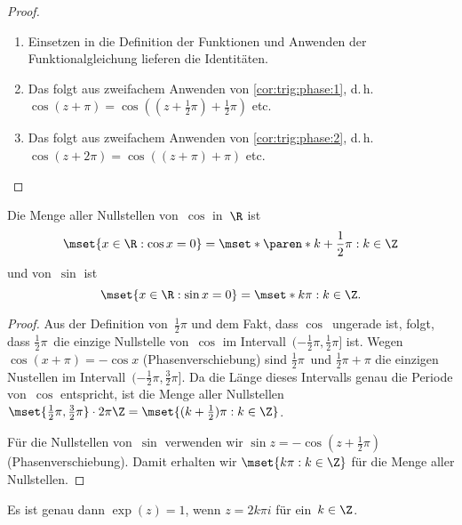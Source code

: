 \documentclass[a4paper]{article}
\begin{document}
\begin{proof}\leavevmode
    \begin{enumerate}
        \item Einsetzen in die Definition der Funktionen und Anwenden der Funktionalgleichung lieferen die Identitäten.
        \item Das folgt aus zweifachem Anwenden von \cref{cor:trig:phase:1}, d.\,h.\ $\cos(z+\pi) = \cos((z+\frac{1}{2}\pi) + \frac{1}{2}\pi)$ etc.
        \item Das folgt aus zweifachem Anwenden von \cref{cor:trig:phase:2}, d.\,h.\ $\cos(z+2\pi) = \cos((z+\pi) +\pi)$ etc.
    \end{enumerate}
\end{proof}

\begin{theorem}[Nullstellen in~$\R$]
    Die Menge aller Nullstellen von~$\cos$ in~$\R$ ist
    \begin{equation*}
        \mset{x \in \R : \cos x = 0} = \mset*{\paren*{k+\frac{1}{2}}\pi : k \in \Z}
    \end{equation*}
    und von~$\sin$ ist
    \begin{equation*}
        \mset{x \in \R : \sin x = 0} = \mset*{k\pi : k \in \Z}.
    \end{equation*}
\end{theorem}

\begin{proof}
    Aus der Definition von~$\frac{1}{2}\pi$ und dem Fakt, dass $\cos$~ungerade ist, folgt, dass $\frac{1}{2}\pi$~die einzige Nullstelle von~$\cos$ im Intervall~$(-\frac{1}{2}\pi, \frac{1}{2}\pi]$ ist. Wegen $\cos(x+\pi) = -\cos x$ (Phasenverschiebung) sind $\frac{1}{2}\pi$~und $\frac{1}{2}\pi+\pi$ die einzigen Nustellen im Intervall~$(-\frac{1}{2}\pi, \frac{3}{2}\pi]$. Da die Länge dieses Intervalls genau die Periode von~$\cos$ entspricht, ist die Menge aller Nullstellen $\mset{\frac{1}{2}\pi, \frac{3}{2}\pi} \cdot 2\pi\Z = \mset{(k+\frac{1}{2})\pi : k \in \Z}$.

    Für die Nullstellen von~$\sin$ verwenden wir $\sin z = -\cos(z+\frac{1}{2}\pi)$ (Phasenverschiebung). Damit erhalten wir $\mset{k\pi : k \in \Z}$ für die Menge aller Nullstellen.
\end{proof}

\begin{corollary}\label{cor:complex:exp1}
    Es ist genau dann $\exp(z) = 1$, wenn $z = 2k\pi i$ für ein~$k \in \Z$.
\end{corollary}
\end{document}
